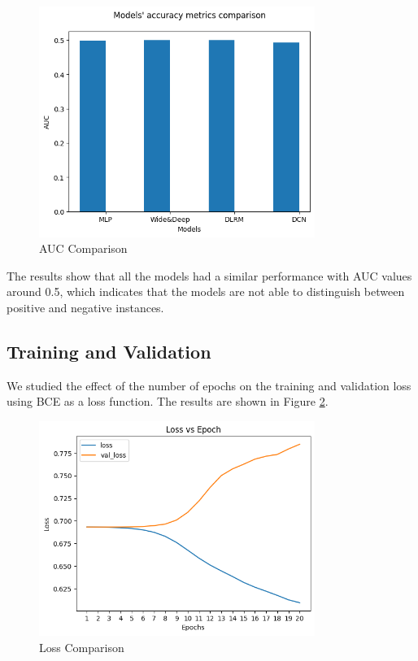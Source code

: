 \begin{figure}[H]
    \centering
    \includegraphics[width=0.8\textwidth]{assets/models_comparasion.png}
    \caption[AUC Comparison]{AUC Comparison}
    \label{fig:AUCComparison}
\end{figure}

The results show that all the models had a similar performance with AUC values around 0.5, which indicates that the models are not able to distinguish between positive and negative instances.

\subsection{Training and Validation}
We studied the effect of the number of epochs on the training and validation loss using BCE as a loss function. The results are shown in Figure \ref{fig:LossComparison}.

\begin{figure}[H]
    \centering
    \includegraphics[width=0.8\textwidth]{assets/loss_epochs_20.png}
    \caption[Loss Comparison]{Loss Comparison}
    \label{fig:LossComparison}
\end{figure}

